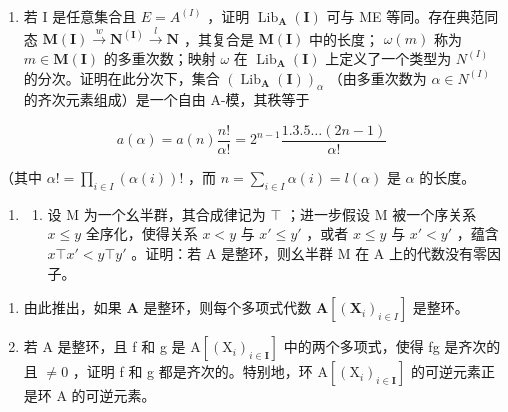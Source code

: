 \begin{enumerate}
\def\labelenumi{(\alph{enumi})}
\setcounter{enumi}{3}
\tightlist
\item
  若 I 是任意集合且 \(E = A^{(I)}\) ，证明 \(\operatorname{Lib}_{\mathbf{A}}(\mathbf{I})\) 可与 ME 等同。存在典范同态 \(\mathbf{M}(\mathbf{I}) \xrightarrow{w} \mathbf{N}^{(\mathbf{I})} \xrightarrow{l} \mathbf{N}\) ，其复合是 \(\mathbf{M}(\mathbf{I})\) 中的长度； \(\omega(m)\) 称为 \(m \in \mathbf{M}(\mathbf{I})\) 的多重次数；映射 \(\omega\) 在 \(\operatorname{Lib}_{\mathbf{A}}(\mathbf{I})\) 上定义了一个类型为 \(N^{(I)}\) 的分次。证明在此分次下，集合 \((\operatorname{Lib}_{\mathbf{A}}(\mathbf{I}))_{\alpha}\) （由多重次数为 \(\alpha \in N^{(I)}\) 的齐次元素组成）是一个自由 A-模，其秩等于
\end{enumerate}

\[
a (\alpha) = a (n) \frac {n !}{\alpha !} = 2 ^ {n - 1} \frac {1 . 3 . 5 \dots (2 n - 1)}{\alpha !}
\]

（其中 \(\alpha! = \prod_{i \in I} (\alpha(i))!\) ，而 \(n = \sum_{i \in I} \alpha(i) = l(\alpha)\) 是 \(\alpha\) 的长度。

\begin{enumerate}
\def\labelenumi{\arabic{enumi}.}
\setcounter{enumi}{13}
\tightlist
\item
  \begin{enumerate}
  \def\labelenumii{(\alph{enumii})}
  \tightlist
  \item
    设 M 为一个幺半群，其合成律记为 \(\top\) ；进一步假设 M 被一个序关系 \(x \leqslant y\) 全序化，使得关系 \(x < y\) 与 \(x' \leqslant y'\) ，或者 \(x \leqslant y\) 与 \(x' < y'\) ，蕴含 \(x \top x' < y \top y'\) 。证明：若 A 是整环，则幺半群 M 在 A 上的代数没有零因子。
  \end{enumerate}
\end{enumerate}

\begin{enumerate}
\def\labelenumi{(\alph{enumi})}
\setcounter{enumi}{1}
\item
  由此推出，如果 \(\mathbf{A}\) 是整环，则每个多项式代数 \(\mathbf{A}[(\mathbf{X}_i)_{i\in I}]\) 是整环。
\item
  若 A 是整环，且 f 和 g 是 \(\mathrm{A}[(\mathrm{X}_{i})_{i\in\mathbf{I}}]\) 中的两个多项式，使得 fg 是齐次的且 \(\neq0\) ，证明 f 和 g 都是齐次的。特别地，环 \(\mathrm{A}[(\mathrm{X}_{i})_{i\in\mathbf{I}}]\) 的可逆元素正是环 A 的可逆元素。
\end{enumerate}

